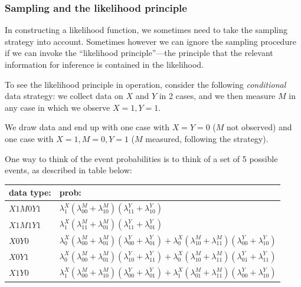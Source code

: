 \documentclass[
  12pt,
]{book}
\begin{document}
\hypertarget{sampling-and-the-likelihood-principle}{%
\subsubsection{Sampling and the likelihood principle}\label{sampling-and-the-likelihood-principle}}

In constructing a likelihood function, we sometimes need to take the sampling strategy into account. Sometimes however we can ignore the sampling procedure if we can invoke the ``likelihood principle''---the principle that the relevant information for inference is contained in the likelihood.

To see the likelihood principle in operation, consider the following \emph{conditional} data strategy: we collect data on \(X\) and \(Y\) in 2 cases, and we then measure \(M\) in any case in which we observe \(X=1, Y=1\).

We draw data and end up with one case with \(X=Y=0\) (\(M\) not observed) and one case with \(X=1, M=0, Y=1\) (\(M\) measured, following the strategy).

One way to think of the event probabilities is to think of a set of 5 possible events, as described in table below:

\begin{longtable}[]{@{}
  >{\raggedright\arraybackslash}p{}
  >{\raggedright\arraybackslash}p{}@{}}
\toprule
data type: & prob: \\
\midrule
\endhead
\(X1M0Y1\) & \(\lambda^X_1(\lambda^M_{00}+\lambda^M_{10})(\lambda^Y_{11}+\lambda^Y_{10})\) \\
\(X1M1Y1\) & \(\lambda^X_1(\lambda^M_{11}+\lambda^M_{01})(\lambda^Y_{11}+\lambda^Y_{01})\) \\
\(X0Y0\) & \(\lambda^X_0(\lambda^M_{00}+\lambda^M_{01})(\lambda^Y_{00}+\lambda^Y_{01}) + \lambda^X_0(\lambda^M_{10}+\lambda^M_{11})(\lambda^Y_{00}+\lambda^Y_{10})\) \\
\(X0Y1\) & \(\lambda^X_0(\lambda^M_{00}+\lambda^M_{01})(\lambda^Y_{10}+\lambda^Y_{11}) + \lambda^X_0(\lambda^M_{10}+\lambda^M_{11})(\lambda^Y_{01}+\lambda^Y_{11})\) \\
\(X1Y0\) & \(\lambda^X_1(\lambda^M_{00}+\lambda^M_{10})(\lambda^Y_{00}+\lambda^Y_{01}) + \lambda^X_1(\lambda^M_{01}+\lambda^M_{11})(\lambda^Y_{00}+\lambda^Y_{10})\) \\
\bottomrule
\end{longtable}
\end{document}
